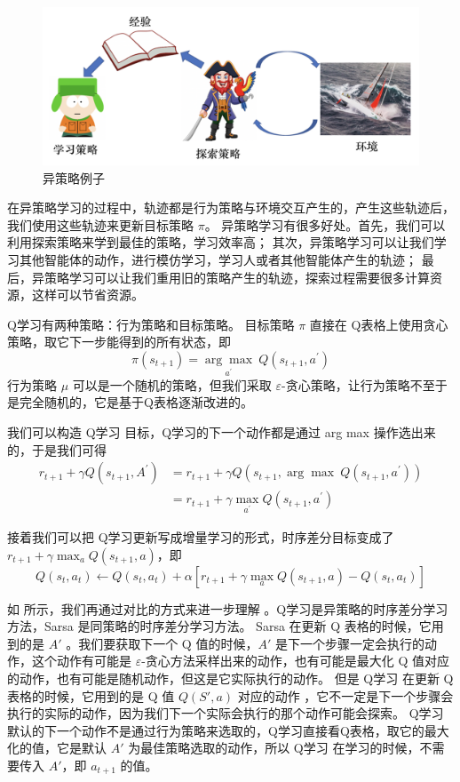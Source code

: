 \begin{figure}[htb]
	\centering
	\includegraphics[width=0.5\linewidth]{res/ch3/off_policy_learning}
	\caption{异策略例子}
	\label{fig:off-policy_2}
\end{figure}

在异策略学习的过程中，轨迹都是行为策略与环境交互产生的，产生这些轨迹后，我们使用这些轨迹来更新目标策略 $\pi$。
异策略学习有很多好处。首先，我们可以利用探索策略来学到最佳的策略，学习效率高；
其次，异策略学习可以让我们学习其他智能体的动作，进行模仿学习，学习人或者其他智能体产生的轨迹；
最后，异策略学习可以让我们重用旧的策略产生的轨迹，探索过程需要很多计算资源，这样可以节省资源。


Q学习有两种策略：行为策略和目标策略。
目标策略 $\pi$ 直接在 Q表格上使用贪心策略，取它下一步能得到的所有状态，即
\begin{equation}
	\pi\left(s_{t+1}\right)=\underset{a^{\prime}}{\arg \max}~ Q\left(s_{t+1}, a^{\prime}\right)
	\label{eq:qtable_greedy}
\end{equation}
行为策略 $\mu$ 可以是一个随机的策略，但我们采取 $\varepsilon$-贪心策略，让行为策略不至于是完全随机的，它是基于Q表格逐渐改进的。

我们可以构造 Q学习 目标，Q学习的下一个动作都是通过 arg max 操作选出来的，于是我们可得
\begin{equation}
	\begin{aligned}
		r_{t+1}+\gamma Q\left(s_{t+1}, A^{\prime}\right) &=r_{t+1}+\gamma Q\left(s_{t+1},\arg \max ~Q\left(s_{t+1}, a^{\prime}\right)\right) \\
		&=r_{t+1}+\gamma \max _{a^{\prime}} Q\left(s_{t+1}, a^{\prime}\right)
		\end{aligned}
	\label{eq:}
\end{equation}

接着我们可以把 Q学习更新写成增量学习的形式，时序差分目标变成了$r_{t+1}+\gamma \max _{a} Q\left(s_{t+1}, a\right)$，即
\begin{equation}
	Q\left(s_{t}, a_{t}\right) \leftarrow Q\left(s_{t}, a_{t}\right)+\alpha\left[r_{t+1}+\gamma \max _{a} Q\left(s_{t+1}, a\right)-Q\left(s_{t}, a_{t}\right)\right]
	\label{eq:}
\end{equation}


如 所示，我们再通过对比的方式来进一步理解 。Q学习是异策略的时序差分学习方法，Sarsa 是同策略的时序差分学习方法。
Sarsa 在更新 Q 表格的时候，它用到的是 $A'$ 。我们要获取下一个 Q 值的时候，$A'$ 是下一个步骤一定会执行的动作，这个动作有可能是 $\varepsilon$-贪心方法采样出来的动作，也有可能是最大化 Q 值对应的动作，也有可能是随机动作，但这是它实际执行的动作。
但是 Q学习 在更新 Q 表格的时候，它用到的是 Q 值 $Q(S',a)$ 对应的动作 ，它不一定是下一个步骤会执行的实际的动作，因为我们下一个实际会执行的那个动作可能会探索。
Q学习默认的下一个动作不是通过行为策略来选取的，Q学习直接看Q表格，取它的最大化的值，它是默认 $A'$ 为最佳策略选取的动作，所以 Q学习 在学习的时候，不需要传入 $A'$，即 $a_{t+1}$  的值。


